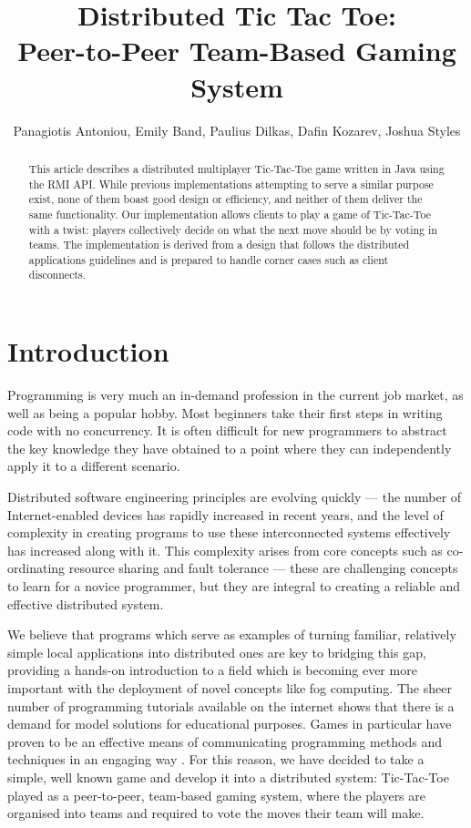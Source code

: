 \documentclass[conference]{IEEEtran}
\begin{document}
\title{Distributed Tic Tac Toe:\\ Peer-to-Peer Team-Based Gaming System}

\author{Panagiotis Antoniou, Emily Band, Paulius Dilkas, Dafin Kozarev, Joshua Styles}
\maketitle

\begin{abstract}
This article describes a distributed multiplayer Tic-Tac-Toe game
written in Java using the RMI API. While previous implementations
attempting to serve a similar purpose exist, none of them boast good
design or efficiency, and neither of them deliver the same
functionality. Our implementation allows clients to play a game of
Tic-Tac-Toe with a twist: players collectively decide on what the next
move should be by voting in teams. The implementation is derived from
a design that follows the distributed applications guidelines and is
prepared to handle corner cases such as client disconnects.
\end{abstract}

\section{Introduction} %
Programming is very much an in-demand profession in the current job market, as well as being a popular hobby. Most beginners take their first steps in writing code
with no concurrency. It is often difficult for new programmers to abstract the key knowledge they have obtained to a point where they can independently apply it to a different scenario.

Distributed software engineering principles are evolving quickly --- the number of Internet-enabled devices has rapidly increased in recent years, and the level of complexity in creating programs to use these interconnected systems effectively has increased along with it. This complexity arises from core concepts such as co-ordinating resource sharing and fault tolerance --- these are challenging concepts to learn for a novice programmer, but they are integral to creating a reliable and effective distributed system. 

We believe that programs which serve as examples of turning familiar, relatively simple local applications into distributed ones are key to bridging this gap, providing a hands-on introduction to a field which is becoming ever more important with the deployment of novel concepts like fog computing. The sheer number of programming tutorials available on the internet shows that there is a demand for model solutions for educational purposes. Games in particular have proven to be an effective means of communicating programming methods and techniques in an engaging way \cite{Kiniry:2011:VG:1984674.1984681}. For this reason, we have decided to take a simple, well known game and develop it into a distributed system: Tic-Tac-Toe played as a peer-to-peer, team-based gaming system, where the players are organised into teams and required to vote the moves their team will make.
\end{document}
